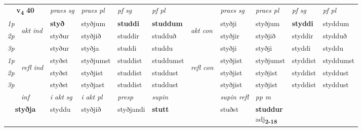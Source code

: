 \noindent
\begin{tabular}{lllllllllll} \toprule
\multicolumn{2}{c}{\textbf{v{\textsubscript{4}}} \Large{\textbf{40}}}  &  \textit{praes sg}  & \textit{praes pl}  &\textit{ pf sg} & \textit{pf pl} &  &  \textit{praes sg}  & \textit{praes pl}  & \textit{pf sg} & \textit{pf pl } \\*
	\cmidrule{3-6} \cmidrule{8-11}
 {\textit{1p}} & \multirow{3}{*}{\begin{turn}{90}\textit{akt ind}\end{turn}} & \textbf{styð} & styðjum & \textbf{studdi} & \textbf{studdum} & \multirow{3}{*}{\begin{turn}{90}\textit{akt con}\end{turn}} &styðji & styðjum & \textbf{styddi} & styddum\\*
 {\textit{2p}} &  &  styður  & styðjið & studdir & studduð & & styðjir & styðjið & styddir & stydduð \\*
{\textit{3p}} &  & styður & styðja & studdi & studdu & & styðji & styðji& styddi & styddu \\*
\cmidrule{3-6} \cmidrule{8-11}
 {\textit{1p}} & \multirow{3}{*}{\begin{turn}{90}\textit{refl ind}\end{turn}}  & styðst & styðjumst & studdist & studdumst & \multirow{3}{*}{\begin{turn}{90}\textit{refl con}\end{turn}}  &styðjist & styðjumst & styddist & styddumst \\*
 {\textit{2p}} &  & styðst & styðjist & studdist & studdust & &styðjist & styðjist & styddist & styddust \\*
 {\textit{3p}}  & & styðst & styðjast & studdist & studdust & & styðjist & styðjist& styddist & styddust \\*
\cmidrule{3-6} \cmidrule{8-11}

   \multicolumn{2}{c}{\textit{inf}}  & \textit{i akt sg} & \textit{i akt pl}   & \textit{presp} & \textit{supin} && \textit{supin refl} & \textit{pp m} \\*
  \multicolumn{2}{c}{\textbf{styðja}} & styddu  & styðjið   & styðjandi &  \textbf{stutt} && stuðst & \specialcell{\textbf{studdur} \\ adj\textbf{\textsubscript{2-18}}} \\*
\end{tabular}

